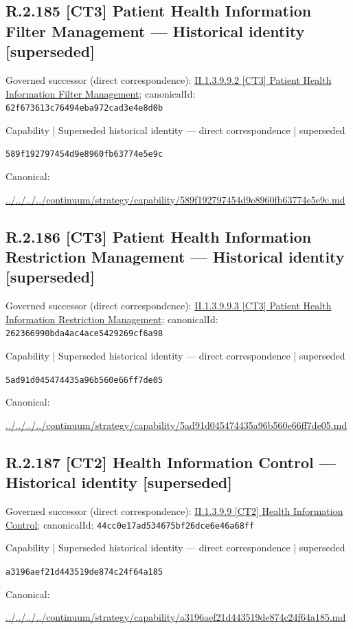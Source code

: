 \documentclass[10pt,a4paper]{article}
\begin{document}
\subsection*{R.2.185 [CT3] Patient Health Information Filter Management — Historical identity [superseded]}
Governed successor (direct correspondence): \hyperref[element-62f673613c76494eba972cad3e4e8d0b]{II.1.3.9.9.2 [CT3] Patient Health Information Filter Management}; canonicalId: \texttt{62f673613c76494eba972cad3e4e8d0b}\par
\label{element-589f192797454d9e8960fb63774e5e9c}
{\small Capability | Superseded historical identity — direct correspondence | superseded}\par
\texttt{589f192797454d9e8960fb63774e5e9c}\par
Canonical: \par
{\footnotesize\url{../../../../continuum/strategy/capability/589f192797454d9e8960fb63774e5e9c.md}}\par
\subsection*{R.2.186 [CT3] Patient Health Information Restriction Management — Historical identity [superseded]}
Governed successor (direct correspondence): \hyperref[element-262366990bda4ac4ace5429269cf6a98]{II.1.3.9.9.3 [CT3] Patient Health Information Restriction Management}; canonicalId: \texttt{262366990bda4ac4ace5429269cf6a98}\par
\label{element-5ad91d045474435a96b560e66ff7de05}
{\small Capability | Superseded historical identity — direct correspondence | superseded}\par
\texttt{5ad91d045474435a96b560e66ff7de05}\par
Canonical: \par
{\footnotesize\url{../../../../continuum/strategy/capability/5ad91d045474435a96b560e66ff7de05.md}}\par
\subsection*{R.2.187 [CT2] Health Information Control — Historical identity [superseded]}
Governed successor (direct correspondence): \hyperref[element-44cc0e17ad534675bf26dce6e46a68ff]{II.1.3.9.9 [CT2] Health Information Control}; canonicalId: \texttt{44cc0e17ad534675bf26dce6e46a68ff}\par
\label{element-a3196aef21d443519de874c24f64a185}
{\small Capability | Superseded historical identity — direct correspondence | superseded}\par
\texttt{a3196aef21d443519de874c24f64a185}\par
Canonical: \par
{\footnotesize\url{../../../../continuum/strategy/capability/a3196aef21d443519de874c24f64a185.md}}\par
\end{document}

